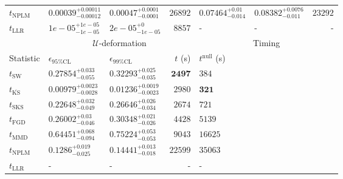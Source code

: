 \begin{tabular}{l|llr|llr}
\rowcolor{red!35}	$t_{\mathrm{NPLM}}$ & $0.00039_{-0.00012}^{+0.00011}$ & $0.00047_{-0.0001}^{+0.0001}$ & $26892$ & $0.07464_{-0.014}^{+0.01}$ & $0.08382_{-0.011}^{+0.0076}$ & $23292$ \\
	$t_{\mathrm{LLR}}$ & $1e-05_{-1e-05}^{+1e-05}$ & $2e-05_{-1e-05}^{+0}$ & $8857$ & - & - & - \\
	\toprule
	\multicolumn{1}{c}{} & \multicolumn{3}{c}{$\mathcal{U}$-deformation} & \multicolumn{3}{c}{Timing} \\
	Statistic & $\epsilon_{95\%\mathrm{CL}}$ & $\epsilon_{99\%\mathrm{CL}}$ & $t$ (s) & $t^{\mathrm{null}}$ (s) \\
	\midrule
	$t_{\mathrm{SW}}$ & $0.27854_{-0.055}^{+0.033}$ & $0.32293_{-0.035}^{+0.025}$ & ${\mathbf{2497}}$ & $384$ \\
	$t_{\overline{\mathrm{KS}}}$ & ${\mathbf{0.00979_{-0.0028}^{+0.0023}}}$ & ${\mathbf{0.01236_{-0.0023}^{+0.0019}}}$ & $2980$ & ${\mathbf{321}}$ \\
	$t_{\mathrm{SKS}}$ & $0.22648_{-0.049}^{+0.032}$ & $0.26646_{-0.034}^{+0.026}$ & $2674$ & $721$ \\
	$t_{\mathrm{FGD}}$ & $0.26002_{-0.046}^{+0.03}$ & $0.30348_{-0.026}^{+0.021}$ & $4428$ & $5139$ \\
	$t_{\mathrm{MMD}}$ & $0.64451_{-0.094}^{+0.068}$ & $0.75224_{-0.053}^{+0.053}$ & $9043$ & $16625$ \\
\rowcolor{red!35}	$t_{\mathrm{NPLM}}$ & $0.1286_{-0.025}^{+0.019}$ & $0.14441_{-0.018}^{+0.013}$ & $22599$ & $35063$ \\
	$t_{\mathrm{LLR}}$ & - & - & - & - \\
	\bottomrule
\end{tabular}